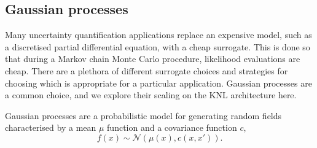 \subsection{Gaussian processes}
\label{sec:chol}

Many uncertainty quantification applications replace an
expensive model, such as a discretised partial differential equation, with a
cheap surrogate.  This is done so that during a Markov chain Monte Carlo
procedure, likelihood evaluations are cheap.  There are a plethora of different
surrogate choices and strategies for choosing which is appropriate for a
particular application.  Gaussian processes are a common choice, and we explore
their scaling on the KNL architecture here.

Gaussian processes are a probabilistic model for generating random fields
characterised by a mean $\mu$ function and a covariance function $c$,
\begin{equation}
  f(x) \sim \mathcal{N}(\mu(x), c(x, x')).
\end{equation}

